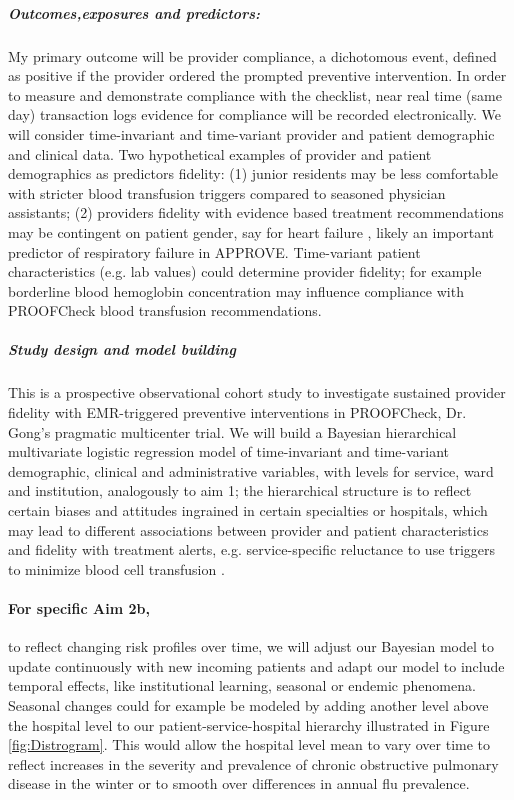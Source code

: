 \documentclass[11pt,notitlepage]{article}
\begin{document}
\subparagraph*{Outcomes,exposures and predictors:}
My primary outcome will be provider compliance, a dichotomous event, defined as positive if the provider ordered the prompted preventive intervention. In order to measure and demonstrate compliance with the checklist, near real time (same day) transaction logs evidence for compliance will be recorded electronically. We will consider time-invariant and time-variant provider and patient demographic and clinical data.  Two hypothetical examples of provider and patient demographics as predictors fidelity: (1) junior residents may be less comfortable with stricter blood transfusion triggers compared to seasoned physician assistants; (2) providers fidelity with evidence based treatment recommendations may be contingent on patient gender, say for heart failure \cite{Cook_25714825}, likely an important predictor of respiratory failure in APPROVE. Time-variant patient characteristics (e.g. lab values) could determine provider fidelity; for example borderline blood hemoglobin concentration may influence compliance with PROOFCheck blood transfusion recommendations.

\subparagraph*{Study design and model building}
This is a prospective observational cohort study to investigate sustained provider fidelity with EMR-triggered preventive interventions in PROOFCheck, Dr. Gong's pragmatic multicenter trial. We will build a Bayesian hierarchical multivariate logistic regression model of time-invariant and time-variant demographic, clinical  and administrative variables, with levels for service, ward and institution, analogously to aim 1; the hierarchical structure is to reflect certain biases and attitudes ingrained in certain specialties or hospitals, which may lead to different associations between provider and patient characteristics and fidelity with treatment alerts, e.g. service-specific reluctance to use triggers to minimize blood cell transfusion \cite{Goodnough_23706801}. 

\paragraph*{For specific Aim 2b,} to reflect changing risk profiles over time, we will adjust our Bayesian model to update continuously with new incoming patients and adapt our model to include temporal effects, like institutional learning, seasonal or endemic phenomena. Seasonal changes could for example be modeled by adding another level above the hospital level to our patient-service-hospital hierarchy illustrated in Figure \ref{fig:Distrogram}. This would allow the hospital level mean to vary over time to reflect increases in the severity and prevalence of chronic obstructive pulmonary disease in the winter or to smooth over differences in annual flu prevalence.
\end{document}
